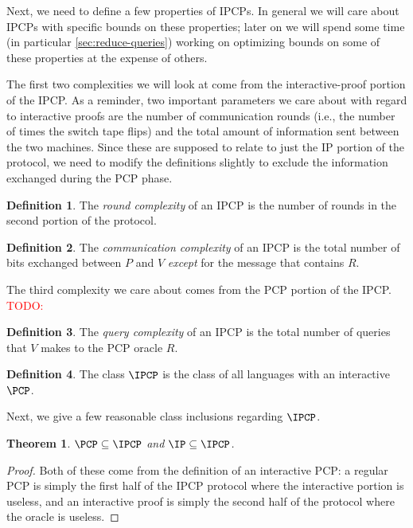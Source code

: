 \documentclass[english,12pt]{reedthesis}
\theoremstyle{plain}
\newtheorem{thm}{Theorem}[section]
\theoremstyle{definition}
\newtheorem{defn}[defn]{Definition}
\theoremstyle{remark}
\newcommand{\TODO}[1]{\textcolor{red}{TODO: #1}}
\begin{document}
Next, we need to define a few properties of IPCPs. In general we will care about
IPCPs with specific bounds on these properties; later on we will spend some time
(in particular \cref{sec:reduce-queries}) working on optimizing bounds on some
of these properties at the expense of others.

The first two complexities we will look at come from the interactive-proof
portion of the IPCP\@. As a reminder, two important parameters we care about
with regard to interactive proofs are the number of communication rounds (i.e.,
the number of times the switch tape flips) and the total amount of information
sent between the two machines. Since these are supposed to relate to just the IP
portion of the protocol, we need to modify the definitions slightly to exclude
the information exchanged during the PCP phase.

\begin{defn}\label{def:ipcp-round-complexity}
  The \emph{round complexity} of an IPCP is the number of rounds in the second
  portion of the protocol.
\end{defn}

\begin{defn}\label{def:ipcp-comm-complexity}
  The \emph{communication complexity} of an IPCP is the total number of bits
  exchanged between $P$ and $V$ \emph{except} for the message that contains $R$.
\end{defn}

The third complexity we care about comes from the PCP portion of the IPCP\@.
\TODO{}

\begin{defn}
  The \emph{query complexity} of an IPCP is the total number of queries that $V$
  makes to the PCP oracle $R$.
\end{defn}

\begin{defn}\label{def:ipcp-class}
  The class $\IPCP$ is the class of all languages with an interactive $\PCP$.
\end{defn}

Next, we give a few reasonable class inclusions regarding $\IPCP$.

\begin{thm}
  $\PCP \subseteq \IPCP$ and $\IP \subseteq \IPCP$.
\end{thm}

\begin{proof}
  Both of these come from the definition of an interactive PCP: a regular PCP is
  simply the first half of the IPCP protocol where the interactive portion is
  useless, and an interactive proof is simply the second half of the protocol
  where the oracle is useless.
\end{proof}
\end{document}
